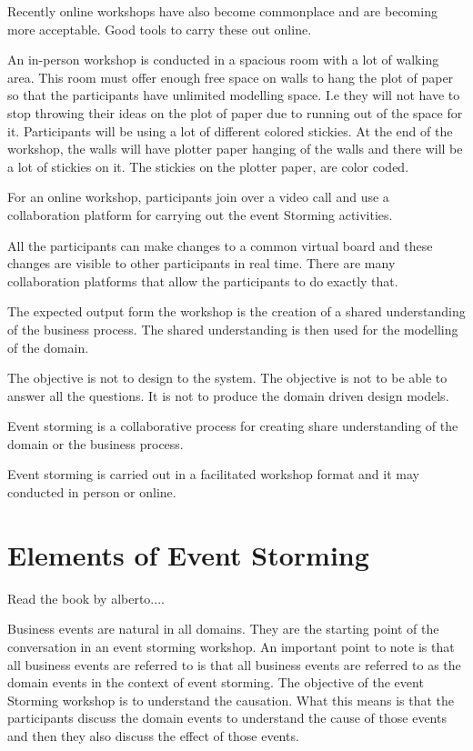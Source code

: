 \documentclass[a4paper, 11pt]{book}
\begin{document}
    Recently online workshops have also become commonplace and are becoming more acceptable.
    Good tools to carry these out online.

    An in-person workshop is conducted in a spacious room with a lot of walking area.
    This room must offer enough free space on walls to hang the plot of paper so that the participants have unlimited modelling space.
    I.e they will not have to stop throwing their ideas on the plot of paper due to running out of the space for it.
    Participants will be using a lot of different colored stickies.
    At the end of the workshop, the walls will have plotter paper hanging of the walls and there will be a lot of stickies on it.
    The stickies on the plotter paper, are color coded.

    For an online workshop, participants join over a video call and use a collaboration platform for carrying out the event Storming activities.

    All the participants can make changes to a common virtual board and these changes are visible to other participants in real time.
    There are many collaboration platforms that allow the participants to do exactly that.

    The expected output form the workshop is the creation of a shared understanding of the business process.
    The shared understanding is then used for the modelling of the domain.

    The objective is not to design to the system.
    The objective is not to be able to answer all the questions.
    It is not to produce the domain driven design models.

    Event storming is a collaborative process for creating share understanding of the domain or the business process.

    Event storming is carried out in a facilitated workshop format and it may conducted in person or online.


    \section{Elements of Event Storming}

    Read the book by alberto....

    Business events are natural in all domains.
    They are the starting point of the conversation in an event storming workshop.
    An important point to note is that all business events are referred to is that all business events are referred to as the domain events in the context of event storming.
    The objective of the event Storming workshop is to understand the causation.
    What this means is that the participants discuss the domain events to understand the cause of those events and then they also discuss the effect of those events.
\end{document}
